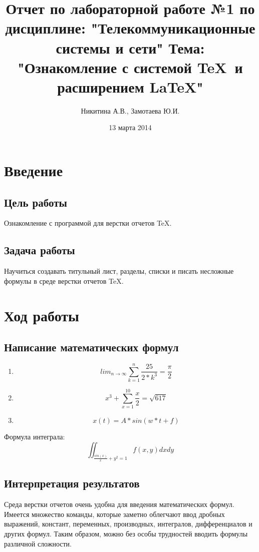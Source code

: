 \documentclass[10pt,a4paper]{report}
\author{Никитина А.В., Замотаева Ю.И.}
\title{Отчет по лабораторной работе №1 по дисциплине: "Телекоммуникационные системы и сети"\newline
Тема: "Ознакомление с системой \TeX\ и расширением \LaTeX "}
\date{13 марта 2014}
\begin{document}
\maketitle
\pagebreak
\chapter{Введение}
\section{Цель работы}
Ознакомление с программой для верстки отчетов \TeX.
\section{Задача работы}
Научиться создавать титульный лист, разделы, списки и писать несложные формулы в среде верстки отчетов \TeX.
\chapter{Ход работы}
\section{Написание математических формул}
\begin{enumerate}
\item
\begin{displaymath}
lim_{n \to \infty}
\sum_{k=1}^n \frac{25}{2*k^3}
= \frac{\pi}{2}
\end{displaymath}
\item 
\begin{displaymath}
x^{3}+\sum_{x=1}^10 \frac{x}{2}
= \sqrt{617}
\end{displaymath}
\item 
\begin{displaymath}
x(t) = A * sin(w*t+f)
\end{displaymath}
\end{enumerate}
Формула интеграла:
\begin{displaymath}
\iint_{\frac{sin(x)}{x}+y^{2} = 1} f(x, y) dx dy 
\end{displaymath}
\section{Интерпретация результатов}
Среда верстки отчетов \Tex очень удобна для введения математических формул. Имеется множество команды, которые заметно облегчают ввод дробных выражений, констант, переменных, производных, интегралов, дифференциалов и других формул. Таким образом, можно без особы трудностей вводить формулы различной сложности.
\end{document}
